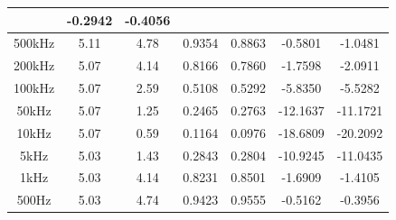\documentclass[12pt]{article}
\begin{document}
\begin{table}[H]
\begin{tabular}{|c|c|c|c|c|c|c|}
& -0.2942    																	& -0.4056
\\ \hline 
500kHz      & 5.11                                                                 & 4.78 & 0.9354                                                                 & 0.8863 
& -0.5801 																		& -1.0481
\\ \hline 
200kHz      & 5.07                                                                 & 4.14 & 0.8166                                                                  & 0.7860 & -1.7598 & -2.0911                                                                                   \\ \hline
100kHz    & 5.07                                                                 & 2.59 & 0.5108                                                                  & 0.5292 & -5.8350 & -5.5282 \\ \hline
50kHz     & 5.07                                                                 & 1.25 & 0.2465                                                                 & 0.2763 & -12.1637 & -11.1721 \\ \hline
10kHz     & 5.07                                                                 & 0.59 & 0.1164                                                                  & 0.0976 & -18.6809 & -20.2092 \\ \hline
5kHz      & 5.03                                                                 & 1.43 & 0.2843                                                                  & 0.2804                                                                              & -10.9245                                                                        & -11.0435 \\ \hline
1kHz      & 5.03                                                                 & 4.14 & 0.8231                                                                 & 0.8501 & -1.6909 & -1.4105 \\ \hline
500Hz     & 5.03                                                                 & 4.74 & 0.9423                                                                  & 0.9555 & -0.5162 & -0.3956 \\ \hline
\end{tabular}
\end{table}
\end{document}
